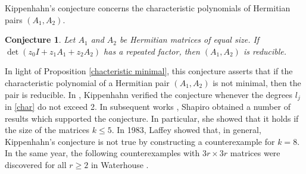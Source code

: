\documentclass[draft, 12pt, reqno]{amsart}
\numberwithin{equation}{section}
\theoremstyle{plain}
\newtheorem{conjecture}[theorem]{Conjecture}
\begin{document}
Kippenhahn's conjecture \cite{Ki} concerns the characteristic polynomials of Hermitian pairs $(A_1, A_2)$. 

\begin{conjecture}
Let $A_1$ and $A_2$ be Hermitian matrices of equal size. If $\det (z_0I+z_1A_1+z_2A_2)$ has a repeated factor, then $(A_1, A_2)$ is reducible.
\end{conjecture}
\noindent In light of Proposition \ref{chacteristic minimal}, this conjecture asserts that if the characteristic polynomial of a Hermitian pair  $(A_1,A_2)$ is not minimal, then the pair is reducible. In \cite{Ki}, Kippenhahn verified the conjecture whenever the degrees $l_j$ in \eqref{char} do not exceed 2.
In subsequent works \cite{Sh1,Sh2}, Shapiro obtained a number of results which supported the conjecture. In particular, she showed that it holds if the size of the matrices $k\leq 5$. In 1983, Laffey \cite{La} showed that, in general, Kippenhahn's conjecture is not true by constructing a counterexample for $k=8$. In the same year, the following counterexamples with $3r\times 3r$ matrices were discovered for all $r\geq 2$ in Waterhouse \cite{Wa}. 
\end{document}
